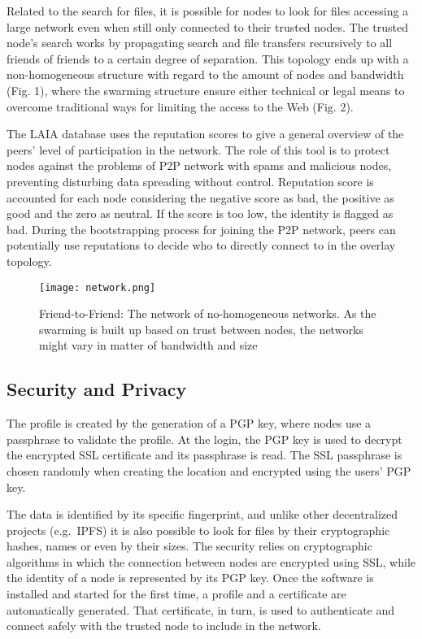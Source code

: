 \documentclass[conference,final,]{IEEEtran}
\makeatletter
\def\maxwidth{\ifdim\Gin@nat@width>\linewidth\linewidth
\else\Gin@nat@width\fi}
\let\Oldincludegraphics\includegraphics
\renewcommand{\includegraphics}[1]{\Oldincludegraphics[width=\maxwidth]{#1}}
\makeatother
\begin{document}
Related to the search for files, it is possible for nodes to look for
files accessing a large network even when still only connected to their
trusted nodes. The trusted node's search works by propagating search and
file transfers recursively to all friends of friends to a certain degree
of separation. This topology ends up with a non-homogeneous structure with
regard to the amount of nodes and bandwidth (Fig. 1), where the
swarming structure ensure either technical or legal means to overcome
traditional ways for limiting the access to the Web (Fig. 2).

The LAIA database uses the reputation scores to give a general overview
of the peers' level of participation in the network. The role of this
tool is to protect nodes against the problems of P2P network with spams
and malicious nodes, preventing disturbing data spreading without
control. Reputation score is accounted for each node considering the
negative score as bad, the positive as good and the zero as neutral. If
the score is too low, the identity is flagged as bad. During the
bootstrapping process for joining the P2P network, peers can potentially
use reputations to decide who to directly connect to in the overlay
topology.

\begin{figure}[htbp]
\centering
\texttt{[image: network.png]}
\caption{Friend-to-Friend: The network of no-homogeneous networks. As
the swarming is built up based on trust between nodes, the networks
might vary in matter of bandwidth and size}
\end{figure}


\hypertarget{security-and-privacy}{%
\subsection{Security and Privacy}\label{security-and-privacy}}

The profile is created by the generation of a PGP key, where nodes
use a passphrase to validate the profile. At the login, the PGP key
is used to decrypt the encrypted SSL certificate and its passphrase is
read. The SSL passphrase is chosen randomly when creating the location and
encrypted using the users' PGP key.

The data is identified by its specific fingerprint, and unlike other
decentralized projects (e.g.~IPFS) it is also possible to look for files
by their cryptographic hashes, names or even by their sizes. The
security relies on cryptographic algorithms in which the connection
between nodes are encrypted using SSL, while the identity of a node is
represented by its PGP key. Once the software is installed and started
for the first time, a profile and a certificate are automatically
generated. That certificate, in turn, is used to authenticate and
connect safely with the trusted node to include in the network.
\end{document}

